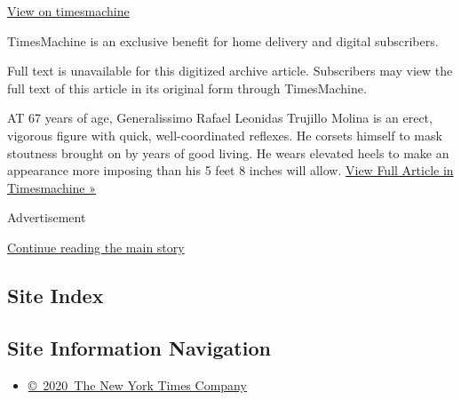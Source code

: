 \href{http://timesmachine.nytimes.com/timesmachine/1959/07/06/89218922.html}{View
on timesmachine}

TimesMachine is an exclusive benefit for home delivery and digital
subscribers.

Full text is unavailable for this digitized archive article. Subscribers
may view the full text of this article in its original form through
TimesMachine.

AT 67 years of age, Generalissimo Rafael Leonidas Trujillo Molina is an
erect, vigorous figure with quick, well-coordinated reflexes. He corsets
himself to mask stoutness brought on by years of good living. He wears
elevated heels to make an appearance more imposing than his 5 feet 8
inches will allow.
\href{http://timesmachine.nytimes.com/timesmachine/1959/07/06/89218922.html}{View
Full Article in Timesmachine »}

Advertisement

\protect\hyperlink{after-bottom}{Continue reading the main story}

\hypertarget{site-index}{%
\subsection{Site Index}\label{site-index}}

\hypertarget{site-information-navigation}{%
\subsection{Site Information
Navigation}\label{site-information-navigation}}

\begin{itemize}
\tightlist
\item
  \href{https://help.nytimes.com/hc/en-us/articles/115014792127-Copyright-notice}{©~2020~The
  New York Times Company}
\end{itemize}

